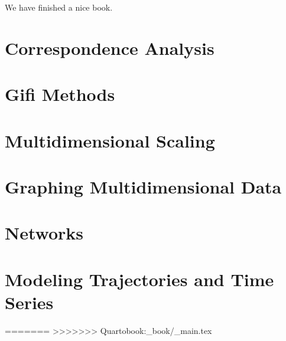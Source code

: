 \documentclass[
]{book}
\begin{document}
We have finished a nice book.

\hypertarget{correspondence-analysis}{%
\chapter{Correspondence Analysis}\label{correspondence-analysis}}

\hypertarget{gifi-methods}{%
\chapter{Gifi Methods}\label{gifi-methods}}

\hypertarget{multidimensional-scaling}{%
\chapter{Multidimensional Scaling}\label{multidimensional-scaling}}

\hypertarget{graphing-multidimensional-data}{%
\chapter{Graphing Multidimensional Data}\label{graphing-multidimensional-data}}

\hypertarget{networks}{%
\chapter{Networks}\label{networks}}

\hypertarget{modeling-trajectories-and-time-series}{%
\chapter{Modeling Trajectories and Time Series}\label{modeling-trajectories-and-time-series}}
=======
>>>>>>> Quartobook:_book/_main.tex

  
\end{document}
